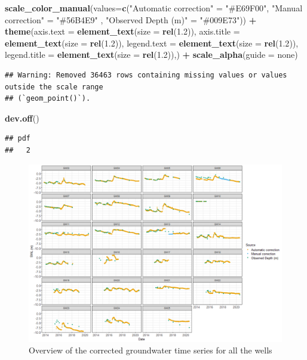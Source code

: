 \documentclass[
]{article}
\newenvironment{Shaded}{\begin{snugshade}}{\end{snugshade}}
\newcommand{\AttributeTok}[1]{\textcolor[rgb]{0.13,0.29,0.53}{#1}}
\newcommand{\FloatTok}[1]{\textcolor[rgb]{0.00,0.00,0.81}{#1}}
\newcommand{\FunctionTok}[1]{\textcolor[rgb]{0.13,0.29,0.53}{\textbf{#1}}}
\newcommand{\NormalTok}[1]{#1}
\newcommand{\OtherTok}[1]{\textcolor[rgb]{0.56,0.35,0.01}{#1}}
\newcommand{\SpecialCharTok}[1]{\textcolor[rgb]{0.81,0.36,0.00}{\textbf{#1}}}
\newcommand{\StringTok}[1]{\textcolor[rgb]{0.31,0.60,0.02}{#1}}
\begin{document}
\begin{Shaded}
\begin{Highlighting}[]
  \FunctionTok{scale\_color\_manual}\NormalTok{(}\AttributeTok{values=}\FunctionTok{c}\NormalTok{(}\StringTok{"Automatic correction"} \OtherTok{=} \StringTok{"\#E69F00"}\NormalTok{,}
                             \StringTok{"Manual correction"} \OtherTok{=} \StringTok{"\#56B4E9"}\NormalTok{ ,}
                             \StringTok{"Observed Depth (m)"} \OtherTok{=} \StringTok{"\#009E73"}\NormalTok{)) }\SpecialCharTok{+}
  \FunctionTok{theme}\NormalTok{(}\AttributeTok{axis.text =} \FunctionTok{element\_text}\NormalTok{(}\AttributeTok{size  =} \FunctionTok{rel}\NormalTok{(}\FloatTok{1.2}\NormalTok{)),}
        \AttributeTok{axis.title =} \FunctionTok{element\_text}\NormalTok{(}\AttributeTok{size =} \FunctionTok{rel}\NormalTok{(}\FloatTok{1.2}\NormalTok{)),}
        \AttributeTok{legend.text =} \FunctionTok{element\_text}\NormalTok{(}\AttributeTok{size  =} \FunctionTok{rel}\NormalTok{(}\FloatTok{1.2}\NormalTok{)),}
        \AttributeTok{legend.title =} \FunctionTok{element\_text}\NormalTok{(}\AttributeTok{size =} \FunctionTok{rel}\NormalTok{(}\FloatTok{1.2}\NormalTok{)),) }\SpecialCharTok{+}
  \FunctionTok{scale\_alpha}\NormalTok{(}\AttributeTok{guide =} \StringTok{\textquotesingle{}none\textquotesingle{}}\NormalTok{)}
\end{Highlighting}
\end{Shaded}

\begin{verbatim}
## Warning: Removed 36463 rows containing missing values or values outside the scale range
## (`geom_point()`).
\end{verbatim}

\begin{Shaded}
\begin{Highlighting}[]
\FunctionTok{dev.off}\NormalTok{()}
\end{Highlighting}
\end{Shaded}

\begin{verbatim}
## pdf 
##   2
\end{verbatim}

\begin{figure}
\includegraphics[width=1\linewidth]{../Figures/Final_Corrected_piezodepths} \caption{Overview of the corrected groundwater time series for all the wells}\label{fig:gw-series}
\end{figure}
\end{document}
